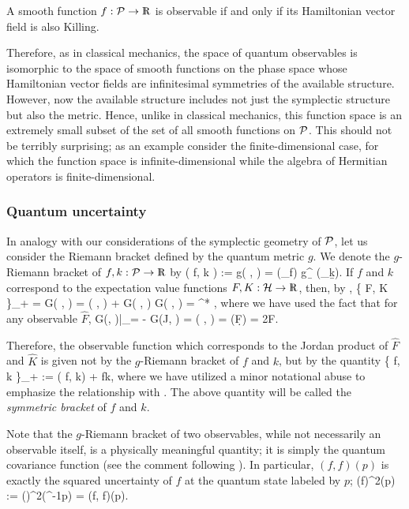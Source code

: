 %
\begin{cor}
A smooth function $f:\P\rightarrow\R$ is observable if and only if its
Hamiltonian vector field is also Killing.
\end{cor}
%
Therefore, as in classical mechanics, the space of quantum observables
is isomorphic to the space of smooth functions on the phase space
whose Hamiltonian vector fields are infinitesimal symmetries of the
available structure.  However, now the available structure includes
not just the symplectic structure but also the metric. Hence, unlike
in classical mechanics, this function space is an extremely small
subset of the set of all smooth functions on $\P$.  This should not be
terribly surprising; as an example consider the finite-dimensional
case, for which the function space is infinite-dimensional while the
algebra of Hermitian operators is finite-dimensional.


\subsubsection{Quantum uncertainty}

In analogy with our considerations of the symplectic geometry of $\P$,
let us consider the Riemann bracket defined by the quantum metric $g$.
We denote the $g$-Riemann bracket of $f,k : \P \rightarrow \R$ by
%
\be
( f, k ) :=  g( ,  )
	  =  (\grad_\a f) g^{\a\b} (\grad_\b k).
\ee
%
If $f$ and $k$ correspond to the expectation value functions
$F, K : \H \rightarrow \R$, then, by ,
%
\be
\{ F, K \}_+  =  G( ,  )
=   ( , )
+  G( \J, ) G( \J, )
= \pi^* \big[ (f,k) + fk \big],
\ee
%
where we have used the fact that for any observable $\hat{F}$,
%
\be
G(\J, )|_\Psi = - G(J\Psi, ) 
= \W( , \Psi ) = \Psi \circ (\d F) = 2F.
\ee
%

Therefore, the observable function which corresponds to the Jordan
product of $\hat{F}$ and $\hat{K}$ is given not by the $g$-Riemann
bracket of $f$ and $k$, but by the quantity
%
\be \label{symmetric_bracket2}
\{ f, k \}_+  := ( f, k) + fk,		
\ee
%
where we have utilized a minor notational abuse to emphasize the
relationship with .  The above quantity will be
called the {\em symmetric bracket} of $f$ and $k$.

Note that the $g$-Riemann bracket of two observables, while not
necessarily an observable itself, is a physically meaningful quantity;
it is simply the quantum covariance function (see the comment
following ).  In particular, $(f, f)(p)$ is exactly
the squared uncertainty of $f$ at the quantum state labeled by $p$;
%
\be \label{new_uncertainty}
(\Delta f)^2(p) := (\Delta {})^2(\pi^{-1}p) = (f, f)(p).
\ee
%

